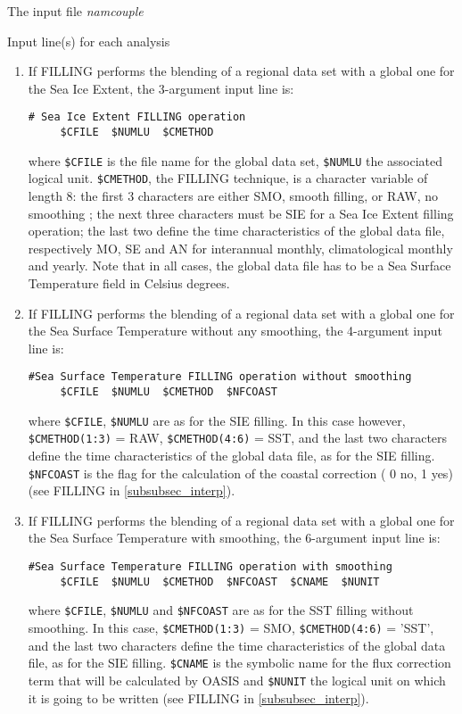 \begin{subsection}{The input file {\it namcouple}}
\begin{subsubsection}{Input line(s) for each analysis}
\begin{itemize}
\begin{enumerate}
\item If FILLING performs the blending of a
regional data set with a global one for the Sea Ice Extent, the
3-argument input line is:
\begin{verbatim}
# Sea Ice Extent FILLING operation
     $CFILE  $NUMLU  $CMETHOD
\end{verbatim} 
where {\tt \$CFILE} is the file name for the global data set, {\tt \$NUMLU}
the associated logical unit. {\tt \$CMETHOD}, the FILLING technique,
is a character variable of length 8: the first 3 characters are either SMO,
smooth filling, or RAW, no smoothing ; the next three
characters must be  SIE for a Sea Ice Extent filling operation;
the last two define the time characteristics of the global data file, 
respectively MO, SE and AN for interannual monthly, climatological 
monthly and yearly. Note that in all cases, the global data file has
to be a Sea Surface Temperature field in Celsius degrees.

\item If FILLING performs the blending of a
regional data set with a global one for the Sea Surface Temperature
without any smoothing, the 4-argument input line is:
\begin{verbatim}
#Sea Surface Temperature FILLING operation without smoothing
     $CFILE  $NUMLU  $CMETHOD  $NFCOAST
\end{verbatim} 
where {\tt \$CFILE}, {\tt \$NUMLU} are as for the SIE filling. In this
case however, {\tt \$CMETHOD(1:3)} = RAW, {\tt \$CMETHOD(4:6)} = SST, and the last two
characters define the time characteristics of the global data file, as
for the SIE filling. {\tt \$NFCOAST} is  
the flag for the calculation of the coastal correction ( 0 no, 1 yes)
(see FILLING in \ref{subsubsec_interp}).

\item If FILLING performs the blending of a
regional data set with a global one for the Sea Surface Temperature
with smoothing, the 6-argument input line is:
\begin{verbatim}
#Sea Surface Temperature FILLING operation with smoothing
     $CFILE  $NUMLU  $CMETHOD  $NFCOAST  $CNAME  $NUNIT
\end{verbatim}  
where {\tt \$CFILE}, {\tt \$NUMLU} and {\tt \$NFCOAST} are as for the SST
filling without smoothing. In this
case, {\tt \$CMETHOD(1:3)} = SMO, {\tt \$CMETHOD(4:6)} = 'SST', 
and the last two
characters define the time characteristics of the global data file, as
for the SIE filling. {\tt \$CNAME} is the symbolic name for the flux 
correction term that will be calculated by OASIS and {\tt \$NUNIT} 
the logical unit on which it is going to be written (see FILLING 
in \ref{subsubsec_interp}). 


\end{enumerate}
\end{itemize}
\end{subsubsection}
\end{subsection}
